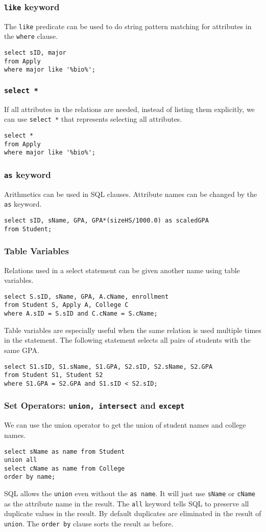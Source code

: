 \subsubsection{\texttt{like} keyword}
The \texttt{like} predicate can be used to do string pattern matching for attributes in the \texttt{where} clause.
\begin{lstlisting}
select sID, major 
from Apply
where major like '%bio%';
\end{lstlisting} 
\subsubsection{\texttt{select *}}
If all attributes in the relations are needed, instead of listing them explicitly, we can use \texttt{select *} that represents selecting all attributes.
\begin{lstlisting}
select * 
from Apply
where major like '%bio%';
\end{lstlisting} 
\subsubsection{\texttt{as} keyword}Arithmetics can be used in SQL clauses. Attribute names can be changed by the \texttt{as} keyword.
\begin{lstlisting}
select sID, sName, GPA, GPA*(sizeHS/1000.0) as scaledGPA
from Student;
\end{lstlisting}
\subsubsection{Table Variables}
Relations used in a select statement can be given another name using table variables. 
\begin{lstlisting}
select S.sID, sName, GPA, A.cName, enrollment
from Student S, Apply A, College C
where A.sID = S.sID and C.cName = S.cName;
\end{lstlisting}
Table variables are especially useful when the same relation is used multiple times in the statement. The following statement selects all pairs of students with the same GPA. 
\begin{lstlisting}
select S1.sID, S1.sName, S1.GPA, S2.sID, S2.sName, S2.GPA
from Student S1, Student S2
where S1.GPA = S2.GPA and S1.sID < S2.sID;
\end{lstlisting}
\subsubsection{Set Operators: \texttt{union, intersect} and \texttt{except}}
We can use the union operator to get the union of student names and college names.
\begin{lstlisting}
select sName as name from Student
union all
select cName as name from College
order by name;
\end{lstlisting}
SQL allows the \texttt{union} even without the \texttt{as name}. It will just use \texttt{sName} or \texttt{cName} as the attribute name in the result. The \texttt{all} keyword tells SQL to preserve all duplicate values in the result. By default duplicates are eliminated in the result of \texttt{union}. The \texttt{order by} clause sorts the result as before.

